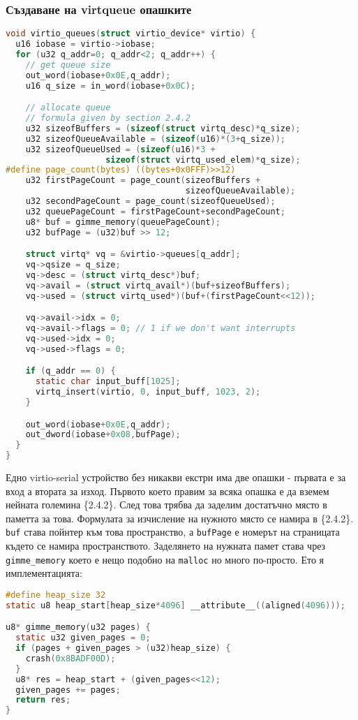 \subsubsection{Създаване на virtqueue опашките}
\begin{lstlisting}[language=C]
void virtio_queues(struct virtio_device* virtio) {
  u16 iobase = virtio->iobase;
  for (u32 q_addr=0; q_addr<2; q_addr++) {
    // get queue size
    out_word(iobase+0x0E,q_addr);
    u16 q_size = in_word(iobase+0x0C);

    // allocate queue
    // formula given by section 2.4.2
    u32 sizeofBuffers = (sizeof(struct virtq_desc)*q_size);
    u32 sizeofQueueAvailable = (sizeof(u16)*(3+q_size));
    u32 sizeofQueueUsed = (sizeof(u16)*3 +
                    sizeof(struct virtq_used_elem)*q_size);
#define page_count(bytes) ((bytes+0x0FFF)>>12)
    u32 firstPageCount = page_count(sizeofBuffers +
                                    sizeofQueueAvailable);
    u32 secondPageCount = page_count(sizeofQueueUsed);
    u32 queuePageCount = firstPageCount+secondPageCount;
    u8* buf = gimme_memory(queuePageCount);
    u32 bufPage = (u32)buf >> 12;

    struct virtq* vq = &virtio->queues[q_addr];
    vq->qsize = q_size;
    vq->desc = (struct virtq_desc*)buf;
    vq->avail = (struct virtq_avail*)(buf+sizeofBuffers);
    vq->used = (struct virtq_used*)(buf+(firstPageCount<<12));

    vq->avail->idx = 0;
    vq->avail->flags = 0; // 1 if we don't want interrupts
    vq->used->idx = 0;
    vq->used->flags = 0;

    if (q_addr == 0) {
      static char input_buff[1025];
      virtq_insert(virtio, 0, input_buff, 1023, 2);
    }

    out_word(iobase+0x0E,q_addr);
    out_dword(iobase+0x08,bufPage);
  }
}
\end{lstlisting}
Едно virtio-serial устройство без никакви екстри има две опашки - първата е за вход а втората за изход. Първото което правим за всяка опашка е да вземем нейната големина \{2.4.2\}. След това трябва да заделим достатъчно място в паметта за това. Формулата за изчисление на нужното място се намира в \{2.4.2\}. {\tt buf} става пойнтер към това пространство, а {\tt bufPage} е номерът на страницата където се намира пространството. Заделянето на нужната памет става чрез {\tt gimme\_memory} което е нещо подобно на {\tt malloc} но много по-просто. Ето я имплементацията:
\begin{lstlisting}[language=C]
#define heap_size 32
static u8 heap_start[heap_size*4096] __attribute__((aligned(4096)));

u8* gimme_memory(u32 pages) {
  static u32 given_pages = 0;
  if (pages + given_pages > (u32)heap_size) {
    crash(0x8BADF00D);
  }
  u8* res = heap_start + (given_pages<<12);
  given_pages += pages;
  return res;
}
\end{lstlisting}

